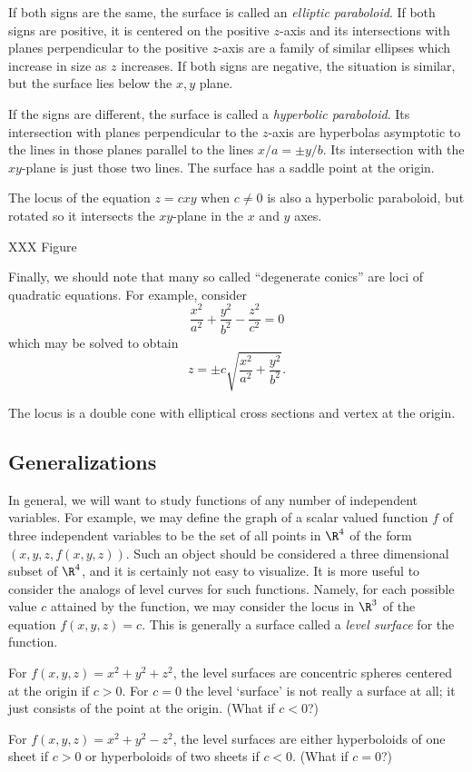 If both signs are the same, the surface is called an {\it elliptic
paraboloid}.   If both signs are positive, it is centered on the
positive $z$-axis and its intersections with planes perpendicular to
the positive $z$-axis are a family of similar ellipses which increase
in size as $z$ increases.   If both signs are negative, the situation
is similar, but the surface lies below the $x,y$ plane.


If the signs are different, the surface is called a {\it
hyperbolic paraboloid}.  Its intersection with planes perpendicular
to the $z$-axis are hyperbolas asymptotic to the lines in
those planes parallel to the lines $x/a = \pm y/b$.   Its intersection
with the $xy$-plane is just those two lines.  The surface has
a saddle point at the origin.


The locus of the equation $z = cxy$ when  $c\neq 0$ is also a hyperbolic
paraboloid, but rotated so it intersects the $xy$-plane in the
$x$ and $y$ axes. 

XXX Figure

Finally, we should note that many so called ``degenerate conics''
are loci of quadratic equations.   For example, consider
\[
    \frac{x^2}{a^2} + \frac{y^2}{b^2} - \frac{z^2}{c^2} = 0
\]
which may be solved to obtain
\[
   z = \pm c\sqrt{\frac{x^2}{a^2} + \frac{y^2}{b^2}}. 
\]

The locus is a double cone with elliptical cross sections and
vertex at the origin.  

\subsection{Generalizations}
In general, we will want to study functions of any number of independent
variables.   For example, we may define the graph of a scalar valued
function $f$ of three independent variables to be the set of all points
in $\R^4$ of the form $(x,y,z,f(x,y,z))$.   Such an object
should be considered a three dimensional subset of $\R^4$, and it is
certainly not easy to visualize.  It is more useful to consider the
analogs of level curves for such functions.  Namely, for each
possible value $c$ attained by the function, we may consider the
locus in $\R^3$ of the equation $f(x,y,z) = c$.  This is generally
a surface called a \emph{level surface} for the function. 

\begin{example}
For $f(x, y, z) = x^2 + y^2 + z^2$, the level surfaces are
concentric spheres centered at the origin if $c > 0$.   For
$c = 0$ the level `surface' is not really a surface at all; it
just consists of the point at the origin.   (What if $c < 0$?) 

For $f(x,y,z) = x^2 + y^2 - z^2$, the level surfaces are either
hyperboloids of one sheet if $c > 0$ or hyperboloids of two sheets
if $c < 0$.  (What if $c = 0$?)
\end{example}


